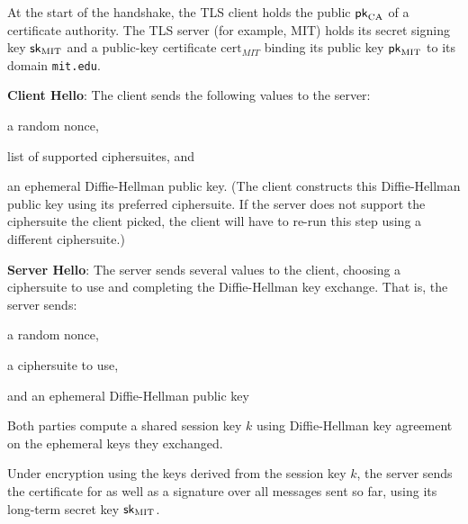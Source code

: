 \begin{compactenum}
\item At the start of the handshake, the TLS client
  holds the public $\mathsf{pk}_{\text{CA}}$ of a certificate authority.
  The TLS server (for example, MIT) holds its secret signing key
  ${\mathsf{sk}}_\text{MIT}$ and a public-key certificate $\text{cert}_{MIT}$
  binding its public key $\mathsf{pk}_\text{MIT}$ to its domain \texttt{mit.edu}.
\item \textbf{Client Hello}: The client sends the following values to
  the server:
	\begin{compactitem}
		\item a random nonce,
		\item list of supported ciphersuites, and
		\item an ephemeral Diffie-Hellman public key.
          (The client constructs this Diffie-Hellman public key
          using its preferred ciphersuite. If the server does not
          support the ciphersuite the client picked, the client
          will have to re-run this step using a different
          ciphersuite.)
	\end{compactitem}
\item \textbf{Server Hello}: The server sends several values to the client, choosing a ciphersuite to use and completing the Diffie-Hellman key exchange. 
  That is, the server sends:
	\begin{compactitem}
		\item a random nonce,
		\item a ciphersuite to use,
		\item and an ephemeral Diffie-Hellman public key
	\end{compactitem}
\item Both parties compute a shared session key $k$
  using Diffie-Hellman key agreement on the ephemeral keys 
  they exchanged.
\item Under encryption using the keys derived from the session key $k$, the server sends the certificate for  as well as a signature over all messages sent so far, using its long-term secret key ${\mathsf{sk}}_\text{MIT}$.

\end{compactenum}
